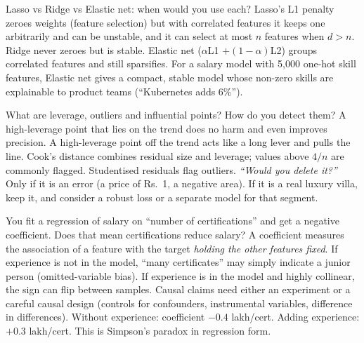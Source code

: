 \begin{qa}{Lasso vs Ridge vs Elastic net: when would you use each?}
\why Lasso's L1 penalty zeroes weights (feature selection) but with correlated features it keeps one arbitrarily and
can be unstable, and it can select at most $n$ features when $d > n$. Ridge never zeroes but is stable. Elastic net
($\alpha$L1 $+ (1-\alpha)$L2) groups correlated features and still sparsifies.
\inpractice For a salary model with 5{,}000 one-hot skill features, Elastic net gives a compact, stable model whose
non-zero skills are explainable to product teams (``Kubernetes adds 6\%'').
\end{qa}

\begin{qa}{What are leverage, outliers and influential points? How do you detect them?}
\why A high-leverage point that lies on the trend does no harm and even improves precision. A high-leverage point
off the trend acts like a long lever and pulls the line. Cook's distance combines residual size and leverage;
values above $4/n$ are commonly flagged. Studentised residuals flag outliers.
\pushes \emph{``Would you delete it?''} Only if it is an error (a price of Rs.~1, a negative area). If it is a real
luxury villa, keep it, and consider a robust loss or a separate model for that segment.
\end{qa}

\begin{qa}{\deep You fit a regression of salary on ``number of certifications'' and get a negative coefficient.
Does that mean certifications reduce salary?}
\why A coefficient measures the association of a feature with the target \emph{holding the other features fixed}.
If experience is not in the model, ``many certificates'' may simply indicate a junior person (omitted-variable
bias). If experience is in the model and highly collinear, the sign can flip between samples. Causal claims need
either an experiment or a careful causal design (controls for confounders, instrumental variables, difference in
differences).
\worked Without experience: coefficient $-0.4$ lakh/cert. Adding experience: $+0.3$ lakh/cert. This is Simpson's
paradox in regression form.
\end{qa}

